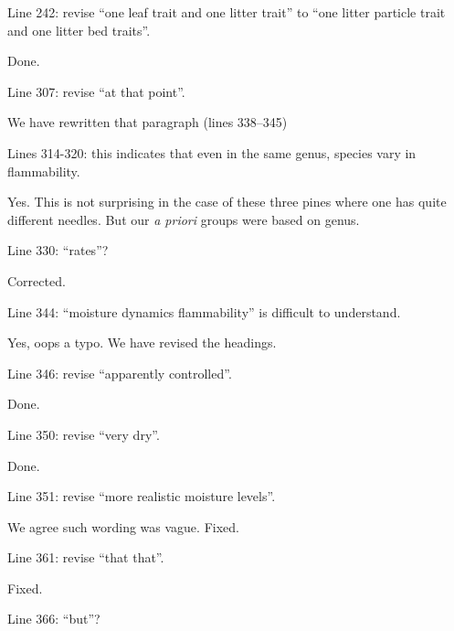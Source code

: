\documentclass[letterpaper, 12pt]{letter}
\begin{document}
\begin{letter}{}
\begin{quoting}
  Line 242: revise “one leaf trait and one litter trait” to “one litter
  particle trait and one litter bed traits”.
\end{quoting}

Done.

\begin{quoting}
  Line 307: revise “at that point”.
\end{quoting}

We have rewritten that paragraph (lines 338--345)

\begin{quoting}
  Lines 314-320: this indicates that even in the same genus, species vary in
  flammability.
\end{quoting}

Yes. This is not surprising in the case of these three pines where one has
quite different needles. But our \emph{a priori} groups were based on genus. 

\begin{quoting}
Line 330: “rates”?
\end{quoting}

Corrected.

\begin{quoting}
  Line 344: “moisture dynamics flammability” is difficult to understand.
\end{quoting}

Yes, oops a typo. We have revised the headings.

\begin{quoting}
  Line 346: revise “apparently controlled”.
\end{quoting}

Done.

\begin{quoting}
  Line 350: revise “very dry”.
\end{quoting}

Done.

\begin{quoting}
Line 351: revise “more realistic moisture levels”.
\end{quoting}

We agree such wording was vague. Fixed.

\begin{quoting}
  Line 361: revise “that that”.
\end{quoting}

Fixed.

\begin{quoting}
  Line 366: “but”?
\end{quoting}


\end{letter}
\end{document}
